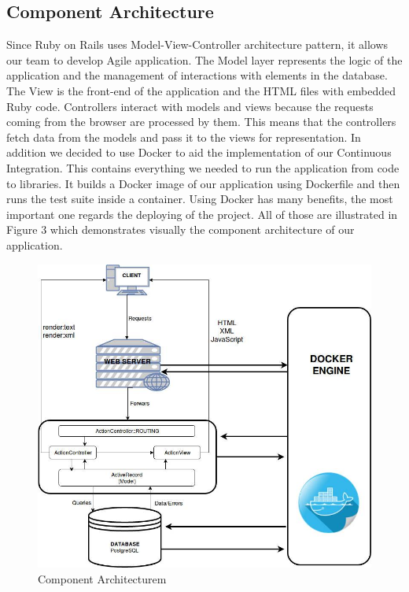 \documentclass{l3proj}
\begin{document}
\subsection{Component Architecture}
\label{sec:component}

Since Ruby on Rails uses Model-View-Controller architecture pattern, it allows our team to develop Agile application. The Model layer represents the logic of the application and the management of interactions with elements in the database. The View is the front-end of the application and the HTML files with embedded Ruby code. Controllers interact with models and views because the requests coming from the browser are processed by them. This means that the controllers fetch data from the models and pass it to the views for representation.
In addition we decided to use Docker \cite{Docker} to aid the implementation of our Continuous Integration. This contains everything we needed to run the application from code to libraries. It builds a Docker image of our application using Dockerfile and then runs the test suite inside a container. Using Docker has many benefits, the most important one regards the deploying of the project.
All of those are illustrated in Figure 3 which demonstrates visually the component architecture of our application.

\begin{figure}
 \centerline{\includegraphics[width=\textwidth, height=\textheight, keepaspectratio]{component.png}}
 \caption{Component Architecturem}
 \label{fig:ca}
\end{figure}
\end{document}
